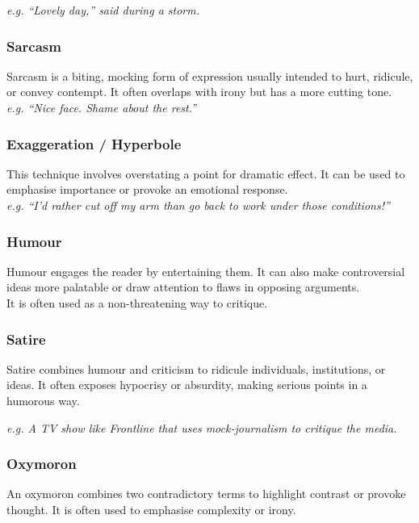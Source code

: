 \documentclass[a4paper]{article}
\begin{document}
\textit{e.g. “Lovely day,” said during a storm.}\\

\subsubsection{Sarcasm}
Sarcasm is a biting, mocking form of expression usually intended to hurt, ridicule, or convey contempt. It often overlaps with irony but has a more cutting tone.\\

\textit{e.g. “Nice face. Shame about the rest.”}\\

\subsubsection{Exaggeration / Hyperbole}
This technique involves overstating a point for dramatic effect. It can be used to emphasise importance or provoke an emotional response.\\

\textit{e.g. “I’d rather cut off my arm than go back to work under those conditions!”}\\

\subsubsection{Humour}
Humour engages the reader by entertaining them. It can also make controversial ideas more palatable or draw attention to flaws in opposing arguments.\\

It is often used as a non-threatening way to critique.\\

\subsubsection{Satire}
Satire combines humour and criticism to ridicule individuals, institutions, or ideas. It often exposes hypocrisy or absurdity, making serious points in a humorous way.

\textit{e.g. A TV show like \textit{Frontline} that uses mock-journalism to critique the media.}\\

\subsubsection{Oxymoron}
An oxymoron combines two contradictory terms to highlight contrast or provoke thought. It is often used to emphasise complexity or irony.\\
\end{document}

